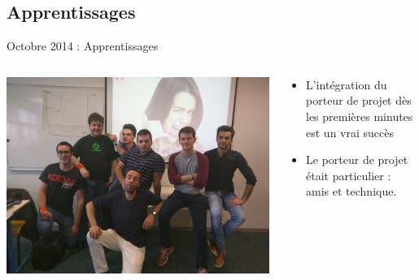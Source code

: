 \documentclass{beamer}
\begin{document}
\subsection{Apprentissages}
\begin{frame}{Octobre 2014 : Apprentissages}
  \begin{columns}
    \begin{column}{0.5\textwidth}
      \begin{center}
        \includegraphics[width=\textwidth]{includes/201510_ausecours.jpg}      
      \end{center}
    \end{column}
    \begin{column}{0.5\textwidth}
  \begin{itemize}
    \item L'intégration du porteur de projet dès les premières minutes est un vrai succès
    \item Le porteur de projet était particulier : amis et technique.
  \end{itemize}
    \end{column}
  \end{columns}
\end{frame}
\end{document}
